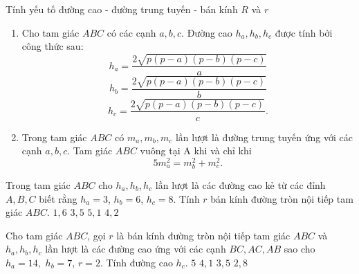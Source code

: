 \begin{dang}{Tính yếu tố đường cao - đường trung tuyến - bán kính $R$ và $r$}
\begin{enumerate}
		\item Cho tam giác $ABC$ có các cạnh $a,b,c$. Đường cao $h_a,h_b,h_c$ được tính bởi công thức sau:
		$$h_a=\dfrac{2\sqrt{p(p-a)(p-b)(p-c)}}{a}$$
		$$h_b=\dfrac{2\sqrt{p(p-a)(p-b)(p-c)}}{b}$$
		$$h_c=\dfrac{2\sqrt{p(p-a)(p-b)(p-c)}}{c}.$$
		\item Trong tam giác $ABC$ có $m_a,m_b,m_c$ lần lượt là đường trung tuyến ứng với các cạnh $a,b,c$. Tam giác $ABC$ vuông tại A khi và chỉ khi $$5m_a^2=m_b^2+m_c^2.$$
	\end{enumerate}
\end{dang}

\begin{vd}%
	Trong tam giác $ABC$ cho $h_a, h_b, h_c$ lần lượt là các đường cao kẻ từ các đỉnh $A,B,C$ biết rằng $h_a=3$, $h_b=6$, $h_c=8$. Tính $r$ bán kính  đường tròn nội tiếp tam giác $ABC$.
	\choice
	{\True $1,6$}
	{$3,5$}
	{$5,1$}
	{$4,2$}
\end{vd}

\begin{vd}%
	Cho tam giác $ABC$, gọi $r$ là bán kính đường tròn nội tiếp tam giác $ABC$ và $h_a,h_b,h_c$ lần lượt là các đường cao ứng với các cạnh $BC,AC,AB$ sao cho $h_a=14,$ $h_b=7$, $r=2.$ Tính đường cao $h_c$.
	\choice
	{$5$}
	{$4{,}1$}
	{\True $3{,}5$}
	{$2{,}8$}
\end{vd}

